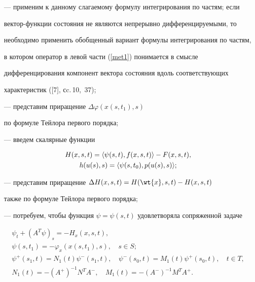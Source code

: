 --- применим к данному слагаемому формулу интегрирования по частям; если


вектор-функции состояния не являются непрерывно дифференцируемыми, то 


необходимо применить обобщенный вариант формулы интегрирования по частям,


в котором оператор в левой части (\ref{met1}) понимается в смысле


дифференцирования компонент вектора состояния вдоль соответствующих 


характеристик ([7], сc.\,10,~37);





--- представим приращение $\Delta\varphi (x(s,t_1),s)$ 


по формуле Тейлора первого порядка;





--- введем скалярные функции


\begin{gather*}


H(x,s,t)=\la\psi (s,t), f(x,s,t)\ra-F(x,s,t),\\


h(u(s),s)=\la\psi(s,t_0),p(u(s),s)\ra;


\end{gather*}





--- представим приращение $\Delta H(x,s,t)=H(\wt{x},s,t)-H(x,s,t)$


также по формуле Тейлора первого порядка;





--- потребуем, чтобы функция $\psi=\psi(s,t)$ удовлетворяла сопряженной задаче


\begin{gather*}


\psi_t+(A^T\psi)_s=-H_x (x,s,t),\\


\psi(s,t_1)=-\varphi_x (x (s,t_1),s),\quad s\in S; \\


\psi^+ (s_1,t)=N_1 (t)\psi^- (s_1,t),\quad


\psi^- (s_0,t)=M_1 (t)\psi^+ (s_0,t),\quad t\in T,\\


N_1(t)=-(A^+)^{-1}N^TA^-,\quad M_1 (t)=-(A^-)^{-1} M^T A^+.


\end{gather*}





